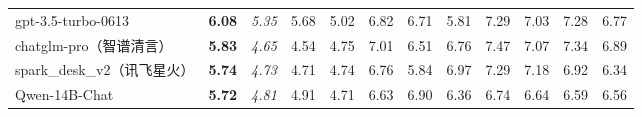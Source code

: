 \documentclass[11pt, a4paper, logo, copyright, nonumbering]{deepseek}
\begin{document}
\begin{CJK*}{UTF8}{gbsn}
\begin{table}[t]
{\begin{tabular}{@{}l|c|ccc|ccccccc@{}}
gpt-3.5-turbo-0613              & \textbf{6.08}                     & \multicolumn{1}{c|}{\textit{5.35}}                                   & 5.68                                            & 5.02                                            & \multicolumn{1}{c|}{6.82}                                            & 6.71                                            & 5.81                                            & 7.29                                            & 7.03                                            & 7.28                                            & 6.77                                            \\
chatglm-pro（智谱清言）           & \textbf{5.83}                     & \multicolumn{1}{c|}{\textit{4.65}}                                   & 4.54                                            & 4.75                                            & \multicolumn{1}{c|}{7.01}                                            & 6.51                                            & 6.76                                            & 7.47                                            & 7.07                                            & 7.34                                            & 6.89                                            \\
spark\_desk\_v2（讯飞星火）       & \textbf{5.74}                     & \multicolumn{1}{c|}{\textit{4.73}}                                   & 4.71                                            & 4.74                                            & \multicolumn{1}{c|}{6.76}                                            & 5.84                                            & 6.97                                            & 7.29                                            & 7.18                                            & 6.92                                            & 6.34                                            \\
Qwen-14B-Chat                   & \textbf{5.72}                     & \multicolumn{1}{c|}{\textit{4.81}}                                   & 4.91                                            & 4.71                                            & \multicolumn{1}{c|}{6.63}                                            & 6.90                                            & 6.36                                            & 6.74                                            & 6.64                                            & 6.59                                            & 6.56                                            \\

\end{tabular}}
\end{table}
\end{CJK*}
\end{document}
